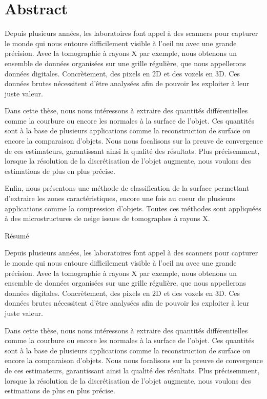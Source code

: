 %
\chapter*{Abstract}
\label{sec:abstract}
\vspace*{-10mm}

Depuis plusieurs années, les laboratoires font appel à des scanners pour
capturer le monde qui nous entoure difficilement visible à l’oeil nu avec une
grande précision. Avec la tomographie à rayons X par exemple, nous obtenons un
ensemble de données organisées sur une grille régulière, que nous appellerons
données digitales. Concrètement, des pixels en 2D et des voxels en 3D. Ces
données brutes nécessitent d’être analysées afin de pouvoir les exploiter à leur
juste valeur.

Dans cette thèse, nous nous intéressons à extraire des quantités différentielles
comme la courbure ou encore les normales à la surface de l’objet. Ces quantités
sont à la base de plusieurs applications comme la reconstruction de surface ou
encore la comparaison d’objets. Nous nous focalisons sur la preuve de
convergence de ces estimateurs, garantissant ainsi la qualité des résultats.
Plus précisemment, lorsque la résolution de la discrétisation de l’objet
augmente, nous voulons des estimations de plus en plus précise.

Enfin, nous présentons une méthode de classification de la surface permettant
d’extraire les zones caractéristiques, encore une fois au coeur de plusieurs
applications comme la compression d’objets. Toutes ces méthodes sont appliquées à
des microstructures de neige issues de tomographes à rayons X.

\vspace*{20mm}

{Résumé}
\label{sec:abstract-french}
\vspace*{5mm}

Depuis plusieurs années, les laboratoires font appel à des scanners pour
capturer le monde qui nous entoure difficilement visible à l’oeil nu avec une
grande précision. Avec la tomographie à rayons X par exemple, nous obtenons un
ensemble de données organisées sur une grille régulière, que nous appellerons
données digitales. Concrètement, des pixels en 2D et des voxels en 3D. Ces
données brutes nécessitent d’être analysées afin de pouvoir les exploiter à leur
juste valeur.

Dans cette thèse, nous nous intéressons à extraire des quantités différentielles
comme la courbure ou encore les normales à la surface de l’objet. Ces quantités
sont à la base de plusieurs applications comme la reconstruction de surface ou
encore la comparaison d’objets. Nous nous focalisons sur la preuve de
convergence de ces estimateurs, garantissant ainsi la qualité des résultats.
Plus précisemment, lorsque la résolution de la discrétisation de l’objet
augmente, nous voulons des estimations de plus en plus précise.

